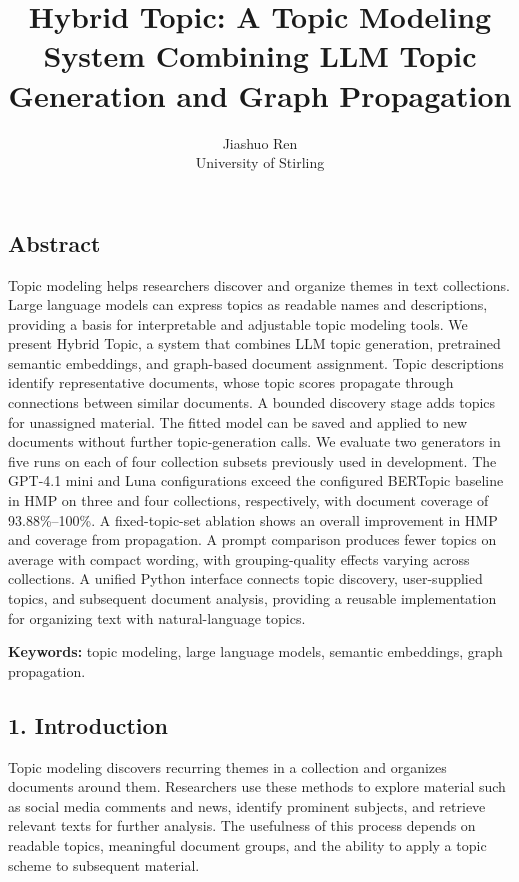\documentclass[
  11pt,
  a4paper,
]{article}
\title{Hybrid Topic: A Topic Modeling System Combining LLM Topic
Generation and Graph Propagation}
\author{Jiashuo Ren\\University of Stirling}
\date{}
\begin{document}
\maketitle

\subsection{Abstract}\label{abstract}

Topic modeling helps researchers discover and organize themes in text
collections. Large language models can express topics as readable names
and descriptions, providing a basis for interpretable and adjustable
topic modeling tools. We present Hybrid Topic, a system that combines
LLM topic generation, pretrained semantic embeddings, and graph-based
document assignment. Topic descriptions identify representative
documents, whose topic scores propagate through connections between
similar documents. A bounded discovery stage adds topics for unassigned
material. The fitted model can be saved and applied to new documents
without further topic-generation calls. We evaluate two generators in
five runs on each of four collection subsets previously used in
development. The GPT-4.1 mini and Luna configurations exceed the
configured BERTopic baseline in HMP on three and four collections,
respectively, with document coverage of 93.88\%--100\%. A
fixed-topic-set ablation shows an overall improvement in HMP and
coverage from propagation. A prompt comparison produces fewer topics on
average with compact wording, with grouping-quality effects varying
across collections. A unified Python interface connects topic discovery,
user-supplied topics, and subsequent document analysis, providing a
reusable implementation for organizing text with natural-language
topics.

\textbf{Keywords:} topic modeling, large language models, semantic
embeddings, graph propagation.

\subsection{1. Introduction}\label{introduction}

Topic modeling discovers recurring themes in a collection and organizes
documents around them. Researchers use these methods to explore material
such as social media comments and news, identify prominent subjects, and
retrieve relevant texts for further analysis. The usefulness of this
process depends on readable topics, meaningful document groups, and the
ability to apply a topic scheme to subsequent material.
\end{document}
